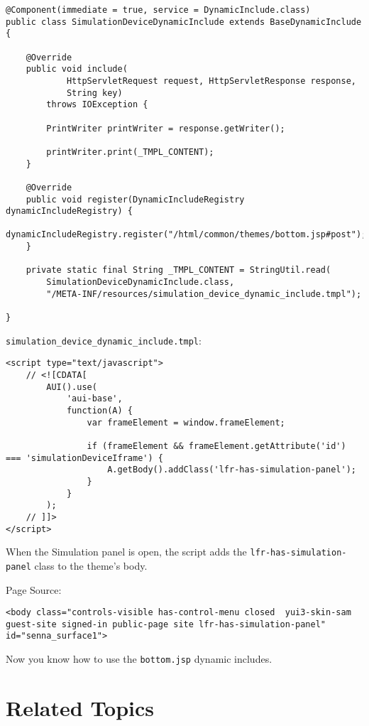 \begin{verbatim}
@Component(immediate = true, service = DynamicInclude.class)
public class SimulationDeviceDynamicInclude extends BaseDynamicInclude {

    @Override
    public void include(
            HttpServletRequest request, HttpServletResponse response,
            String key)
        throws IOException {

        PrintWriter printWriter = response.getWriter();

        printWriter.print(_TMPL_CONTENT);
    }

    @Override
    public void register(DynamicIncludeRegistry dynamicIncludeRegistry) {
        dynamicIncludeRegistry.register("/html/common/themes/bottom.jsp#post");
    }

    private static final String _TMPL_CONTENT = StringUtil.read(
        SimulationDeviceDynamicInclude.class,
        "/META-INF/resources/simulation_device_dynamic_include.tmpl");

}
\end{verbatim}

\texttt{simulation\_device\_dynamic\_include.tmpl}:

\begin{verbatim}
<script type="text/javascript">
    // <![CDATA[
        AUI().use(
            'aui-base',
            function(A) {
                var frameElement = window.frameElement;

                if (frameElement && frameElement.getAttribute('id') === 'simulationDeviceIframe') {
                    A.getBody().addClass('lfr-has-simulation-panel');
                }
            }
        );
    // ]]>
</script>
\end{verbatim}

When the Simulation panel is open, the script adds the
\texttt{lfr-has-simulation-panel} class to the theme's body.

Page Source:

\begin{verbatim}
<body class="controls-visible has-control-menu closed  yui3-skin-sam guest-site signed-in public-page site lfr-has-simulation-panel" id="senna_surface1">
\end{verbatim}

Now you know how to use the \texttt{bottom.jsp} dynamic includes.

\section{Related Topics}\label{related-topics-23}

